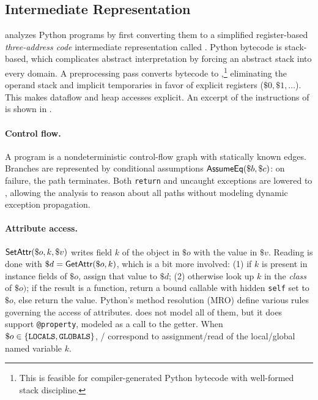 \subsection{Intermediate Representation}
\spyte analyzes Python programs by first converting them to a simplified
register-based \emph{three-address code} intermediate representation called \spytecode. 
Python bytecode is stack-based, which complicates
abstract interpretation by forcing an abstract stack into every domain. A preprocessing
pass converts bytecode to \spytecode,\footnote{This is feasible for compiler-generated Python bytecode with well-formed stack discipline.}
eliminating the operand stack and implicit temporaries in favor of explicit registers
($\$0, \$1, \ldots$). This makes dataflow and heap accesses explicit.
An excerpt of the instructions of \spytecode is shown in .

\paragraph{Control flow.}
A \spytecode program is a nondeterministic control-flow graph with statically known edges.
Branches are represented by conditional assumptions $\textsf{AssumeEq}(\$b, \$c)$:
on failure, the path terminates. Both \texttt{return} and uncaught exceptions
are lowered to \tExit, allowing the analysis to reason about all paths
without modeling dynamic exception propagation.

\paragraph{Attribute access.}
$\textsf{SetAttr}(\$o, k, \$v)$ writes field $k$ of the object in $\$o$ with the value in $\$v$.
Reading is done with
$\$d = \textsf{GetAttr}(\$o, k)$, which is a bit more involved:
(1) if $k$ is present in instance fields of $\$o$, assign that value to $\$d$;
(2) otherwise look up $k$ in the \emph{class}
of $\$o)$; if the result is a function, return
a bound callable with hidden \texttt{self} set to $\$o$, else return the value.
Python's method resolution (MRO) define various rules governing the access of attributes.
\spyte does not model all of them,
but it does support \lstinline|@property|,
modeled as a call to the getter.
When $\$o \in \{\texttt{LOCALS}, \texttt{GLOBALS}\}$, \tSetAttr/\tGetAttr
correspond to assignment/read of the local/global named variable $k$.

